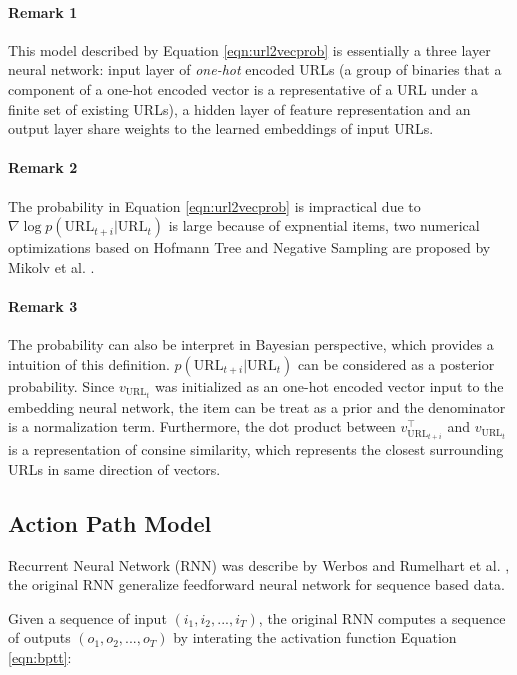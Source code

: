 \paragraph{Remark 1} This model described by Equation \ref{eqn:url2vecprob} is essentially
a three layer neural network: input layer of \emph{one-hot} encoded URLs (a group of binaries
that a component of a one-hot encoded vector is a representative of a URL under a finite set
of existing URLs), a hidden layer of
feature representation and an output layer share weights to the learned embeddings of 
input URLs.

\paragraph{Remark 2} The probability in Equation \ref{eqn:url2vecprob} is impractical due to
$\nabla \log{p(\text{URL}_{t+i} | \text{URL}_t)}$ is large because of expnential items,
two numerical optimizations based on Hofmann Tree and Negative Sampling are proposed 
by Mikolv et al. \cite{mikolv2013embedding}.

\paragraph{Remark 3} The probability can also be interpret in Bayesian perspective,
which provides a intuition of this definition. $p(\text{URL}_{t+i} | \text{URL}_t)$
can be considered as a posterior probability. Since $v_{\text{URL}_t}$ was initialized
as an one-hot encoded vector input to the embedding neural network, the item can be treat
as a prior and the denominator is a normalization term.
Furthermore, the dot product between $v_{\text{URL}_{t+i}} ^\top$
and $v_{\text{URL}_t}$ is a representation of consine similarity, which represents
the closest surrounding URLs in same direction of vectors.

\subsection{Action Path Model}

Recurrent Neural Network (RNN) was describe by Werbos \cite{werbos1990rnn} and 
Rumelhart et al. \cite{Rumelhart:1988:LRB:65669.104451}, the original RNN 
generalize feedforward neural network for sequence based data.

Given a sequence of input $(i_1, i_2, ..., i_T)$, the original RNN computes a
sequence of outputs $(o_1, o_2, ..., o_T)$ 
by interating the activation function Equation \ref{eqn:bptt}:

